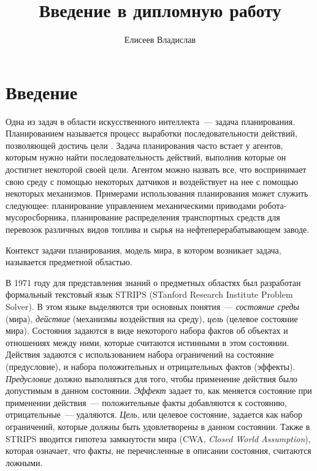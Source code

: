 \documentclass[a4paper,14pt]{extreport}
\title{Введение в дипломную работу}
\author{Елисеев Владислав}
\begin{document}



\setcounter{page}{1}
\linespread{1}
\normalsize

\section*{Введение}
	Одна из задач в области искусственного интеллекта~--- задача планирования.
 Планированием называется процесс выработки последовательности действий, позволяющей достичь цели \cite{norwig-ai}.
 Задача планирования часто встает у агентов, которым нужно найти последовательность действий, выполнив которые он достигнет некоторой своей цели.
 Агентом можно назвать все, что воспринимает свою среду с помощью некоторых датчиков и воздействует на нее с помощью некоторых механизмов.
 Примерами использования планирования может служить следующее: планирование управлением механическими приводами робота-мусоросборника, планирование распределения транспортных средств для перевозок различных видов топлива и сырья на нефтеперерабатывающем заводе.
 
	Контекст задачи планирования, модель мира, в котором возникает задача,  называется предметной областью.
  	
	В 1971 году для представления знаний о предметных областях был разработан формальный текстовый язык STRIPS \cite{strips} (STanford Research Institute Problem Solver).
 В этом языке выделяются три основных понятия~--- \textit{состояние среды} (мира), \textit{действие} (механизмы воздействия на среду), \textit{цель} (целевое состояние мира).
 Состояния задаются в виде некоторого набора фактов об объектах и отношениях между ними, которые считаются истинными в этом состоянии.
 Действия задаются с использованием набора ограничений на состояние (предусловие), и набора положительных и отрицательных фактов (эффекты).
 \textit{Предусловие} должно выполняться для того, чтобы применение действия было допустимым в данном состоянии.
 \textit{Эффект} задает то, как меняется состояние при применении действия~--- положительные факты добавляются к состоянию, отрицательные~--- удаляются.
 \textit{Цель}, или целевое состояние, задается как набор ограничений, которые должны быть удовлетворены в данном состоянии.
 Также в STRIPS вводится гипотеза замкнутости мира (CWA, \textit{Closed World Assumption}), которая означает, что факты, не перечисленные в описании состояния, считаются ложными.
	
\end{document}
